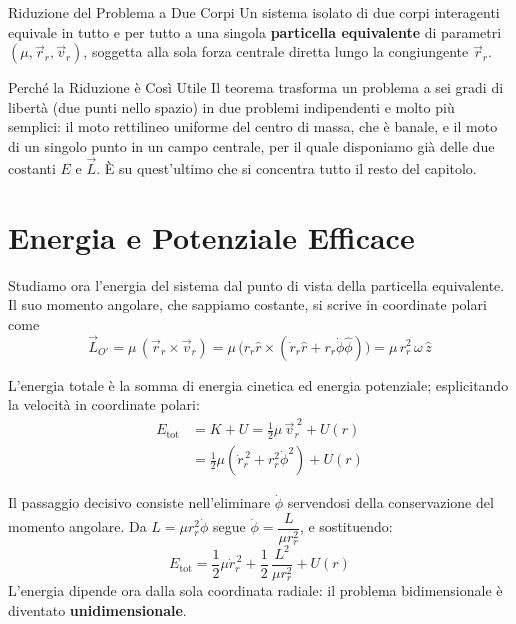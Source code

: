 \begin{teorema}{Riduzione del Problema a Due Corpi}
Un sistema isolato di due corpi interagenti equivale in tutto e per tutto a una singola \textbf{particella equivalente} di parametri $(\mu, \vec{r}_r, \vec{v}_r)$, soggetta alla sola forza centrale diretta lungo la congiungente $\vec{r}_r$.
\end{teorema}

\begin{osservazione}{Perché la Riduzione è Così Utile}
Il teorema trasforma un problema a sei gradi di libertà (due punti nello spazio) in due problemi indipendenti e molto più semplici: il moto rettilineo uniforme del centro di massa, che è banale, e il moto di un singolo punto in un campo centrale, per il quale disponiamo già delle due costanti $E$ e $\vec{L}$. È su quest'ultimo che si concentra tutto il resto del capitolo.
\end{osservazione}

\section{Energia e Potenziale Efficace}

Studiamo ora l'energia del sistema dal punto di vista della particella equivalente. Il suo momento angolare, che sappiamo costante, si scrive in coordinate polari come
\begin{equation}
    \vec{L}_{O'} = \mu \,(\vec{r}_r \times \vec{v}_r)
    = \mu \, \big(r_r \hat{r} \times (\dot{r}_r \hat{r} + r_r \dot{\phi} \hat{\phi})\big)
    = \mu \, r_r^2 \, \omega \, \hat{z}
\end{equation}

L'energia totale è la somma di energia cinetica ed energia potenziale; esplicitando la velocità in coordinate polari:
\begin{align}
    E_{\text{tot}} &= K + U = \frac{1}{2} \mu \, \vec{v}_r^{\;2} + U(r) \\
    &= \frac{1}{2} \mu \left( \dot{r}_r^{\,2} + r_r^2 \dot{\phi}^2 \right) + U(r)
\end{align}

Il passaggio decisivo consiste nell'eliminare $\dot{\phi}$ servendosi della conservazione del momento angolare. Da $L = \mu r_r^2 \dot{\phi}$ segue $\dot{\phi} = \dfrac{L}{\mu r_r^2}$, e sostituendo:
\begin{equation}
    E_{\text{tot}} = \frac{1}{2} \mu \dot{r}_r^{\,2} + \frac{1}{2}\,\frac{L^2}{\mu r_r^2} + U(r)
\end{equation}
L'energia dipende ora dalla sola coordinata radiale: il problema bidimensionale è diventato \textbf{unidimensionale}.

